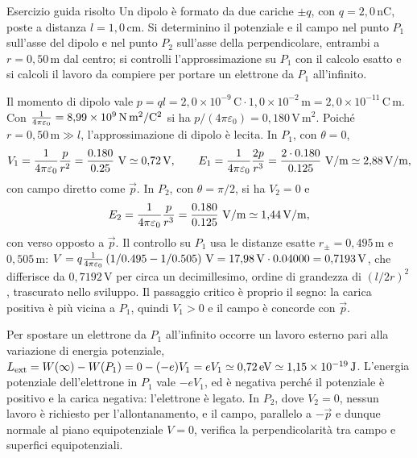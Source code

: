 \documentclass[11pt,a4paper]{article}
\begin{document}
\begin{riquadro}{Esercizio guida risolto}
Un dipolo è formato da due cariche $\pm q$, con $q=\ensuremath{2{,}0\,\mathrm{nC}}$, poste a distanza $l=\ensuremath{1{,}0\,\mathrm{cm}}$. Si determinino il potenziale e il campo nel punto $P_1$ sull'asse del dipolo e nel punto $P_2$ sull'asse della perpendicolare, entrambi a $r=\ensuremath{0{,}50\,\mathrm{m}}$ dal centro; si controlli l'approssimazione su $P_1$ con il calcolo esatto e si calcoli il lavoro da compiere per portare un elettrone da $P_1$ all'infinito.

Il momento di dipolo vale $p=ql=\ensuremath{2{,}0\times10^{-9}\,\mathrm{C}}\cdot\ensuremath{1{,}0\times10^{-2}\,\mathrm{m}}=\ensuremath{2{,}0\times10^{-11}\,\mathrm{C\,m}}$. Con $\frac{1}{4\pi\varepsilon_0}=8{,}99\times10^{9}\,\mathrm{N\,m^2/C^2}$ si ha $p/(4\pi\varepsilon_0)=\ensuremath{0{,}180\,\mathrm{V\,m^2}}$. Poiché $r=\ensuremath{0{,}50\,\mathrm{m}}\gg l$, l'approssimazione di dipolo è lecita. In $P_1$, con $\theta=0$,
\[
V_1=\kc\frac{p}{r^2}=\frac{0.180}{0.25}\ \ensuremath{\mathrm{V}}\simeq\ensuremath{0{,}72\,\mathrm{V}},\qquad
E_1=\kc\frac{2p}{r^3}=\frac{2\cdot0.180}{0.125}\ \ensuremath{\mathrm{V/m}}\simeq\ensuremath{2{,}88\,\mathrm{V/m}},
\]
con campo diretto come $\vec p$. In $P_2$, con $\theta=\pi/2$, si ha $V_2=0$ e
\[
E_2=\kc\frac{p}{r^3}=\frac{0.180}{0.125}\ \ensuremath{\mathrm{V/m}}\simeq\ensuremath{1{,}44\,\mathrm{V/m}},
\]
con verso opposto a $\vec p$. Il controllo su $P_1$ usa le distanze esatte $r_\pm=\ensuremath{0{,}495\,\mathrm{m}}$ e $\ensuremath{0{,}505\,\mathrm{m}}$: $V=q\kc\,(1/0.495-1/0.505)\ \ensuremath{\mathrm{V}}=\ensuremath{17{,}98\,\mathrm{V}}\cdot0.04000=\ensuremath{0{,}7193\,\mathrm{V}}$, che differisce da $\ensuremath{0{,}7192\,\mathrm{V}}$ per circa un decimillesimo, ordine di grandezza di $(l/2r)^2$, trascurato nello sviluppo. Il passaggio critico è proprio il segno: la carica positiva è più vicina a $P_1$, quindi $V_1>0$ e il campo è concorde con $\vec p$.

Per spostare un elettrone da $P_1$ all'infinito occorre un lavoro esterno pari alla variazione di energia potenziale, $L_{\rm ext}=W(\infty)-W(P_1)=0-(-e)V_1=eV_1\simeq\ensuremath{0{,}72\,\mathrm{eV}}\simeq\ensuremath{1{,}15\times10^{-19}\,\mathrm{J}}$. L'energia potenziale dell'elettrone in $P_1$ vale $-eV_1$, ed è negativa perché il potenziale è positivo e la carica negativa: l'elettrone è legato. In $P_2$, dove $V_2=0$, nessun lavoro è richiesto per l'allontanamento, e il campo, parallelo a $-\vec p$ e dunque normale al piano equipotenziale $V=0$, verifica la perpendicolarità tra campo e superfici equipotenziali.
\end{riquadro}
\end{document}
